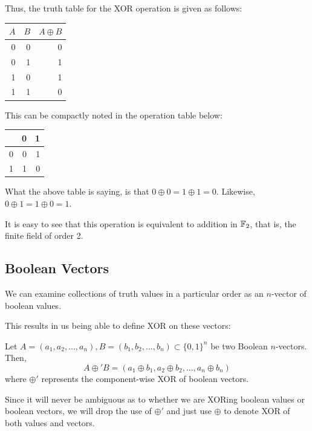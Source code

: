 Thus, the truth table for the XOR operation is given as follows:
\begin{center}
\begin{tabular}{|r|r|r|}
\hline
$A$ & $B$ & $A \oplus B$ \\\hline
0 & 0 & 0 \\\hline
0 & 1 & 1 \\\hline
1 & 0 & 1 \\\hline
1 & 1 & 0 \\\hline
\end{tabular}
\end{center}

This can be compactly noted in the operation table below:
\begin{center}
\begin{tabular}{|r|r|r|}
\hline  
& 0 & 1 \\\hline
0 & 0 & 1 \\\hline
1 & 1 & 0 \\\hline
\end{tabular}
\end{center}

What the above table is saying, is that $0 \oplus 0 = 1 \oplus 1 = 0$.
Likewise, $0 \oplus 1 = 1 \oplus 0 = 1$.

\begin{rem}
It is easy to see that this operation is equivalent to addition in ${\mathbb F}_2$,
that is, the finite field of order 2.
\end{rem}

\subsection{Boolean Vectors}
We can examine collections of truth values in a particular order as an
$n$-vector of boolean values. 

This results in us being able to define XOR on these vectors:

\begin{defn}
Let $A = (a_1, a_2, ... , a_n), B = (b_1, b_2, ... , b_n) \subset \{0,1\}^n$ be two Boolean $n$-vectors. Then,
\begin{equation}
A \oplus' B = (a_1 \oplus b_1, a_2 \oplus b_2, ... , a_n \oplus b_n)
\end{equation}
where $\oplus'$ represents the component-wise XOR of boolean vectors.
\end{defn}

\begin{rem}
Since it will never be ambiguous as to whether we are XORing boolean
values or boolean vectors, we will drop the use of $\oplus'$ and just
use $\oplus$ to denote XOR of both values and vectors.
\end{rem}

